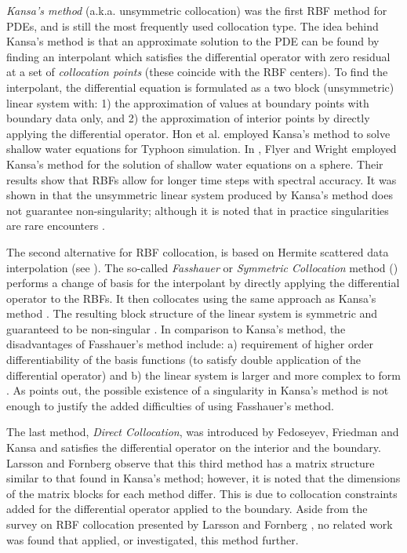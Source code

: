 \documentclass{report}
\begin{document}
{\emph{Kansa's method} \cite{Kansa1990a, Kansa1990b} (a.k.a. unsymmetric collocation) was the first RBF method for PDEs, and is still the most frequently used collocation type. The idea behind Kansa's method is that an 
approximate solution to the PDE can be found by finding an interpolant which satisfies the differential operator with zero residual at a set of \emph{collocation points} (these coincide with the RBF centers). To find the interpolant, the differential equation is formulated as a two block (unsymmetric) linear system with: 1) the approximation of values 
at boundary 
points with boundary data only, and 2) the approximation of interior points by directly applying the differential operator. Hon et al. \cite{Hon1999} employed Kansa's method to solve shallow water equations for Typhoon simulation. In 
\cite{Flyer2009b}, Flyer and Wright employed Kansa's method for the solution of shallow water equations on a sphere. Their 
results show that RBFs allow for longer time steps with spectral accuracy. It was 
shown in \cite{Fasshauer1997, Hon2001} that the unsymmetric linear system produced by Kansa's method does not guarantee 
non-singularity; although it is noted that in practice singularities are rare encounters \cite{Larsson2003}. 

The second alternative for RBF collocation, is based on Hermite scattered 
data interpolation (see \cite{Wu1992}). The so-called \emph{Fasshauer} or \emph{Symmetric Collocation} method (\cite{Fasshauer1997}) 
performs a change of basis for the interpolant by directly applying the differential operator to the RBFs. It then collocates using the same approach as Kansa's method \cite{Stevens2009b, Larsson:2003}. The resulting block structure of the linear system is symmetric and 
guaranteed to be non-singular \cite{Fasshauer1997}. In comparison to Kansa's method, the disadvantages of Fasshauer's method 
include: a) requirement of higher order differentiability of the basis functions (to satisfy double application of the differential operator)
and b) the linear system is larger and more complex to form
 \cite{Fasshauer2007}. As \cite{Hon2001} points out, 
the possible existence of a singularity in Kansa's method is not enough to justify the added difficulties of using Fasshauer's 
method.

The last method, \emph{Direct Collocation}, was introduced by Fedoseyev, Friedman and Kansa
 \cite{Fedoseyev2002} and satisfies the differential operator on the interior and the boundary. Larsson and Fornberg \cite{Larsson2003} observe that this third method has a matrix structure similar to that found in Kansa's method; however, it is noted that the dimensions of the matrix blocks for each method differ. This is due to collocation constraints added for 
the differential operator applied to the boundary. Aside from the survey on RBF collocation presented by Larsson and Fornberg \cite{Larsson2003}, no related 
work was found that applied, or investigated, this method further. 


}
\end{document}

